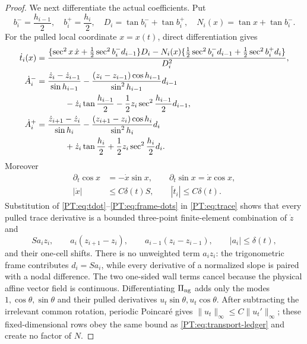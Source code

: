 \begin{proof}
We next differentiate the actual coefficients.  Put
\[
 b_i^- =\frac{h_{i-1}}2,\quad b_i^+=\frac{h_i}2,\quad
 D_i=\tan b_i^-+\tan b_i^+,\quad
 N_i(x)=\tan x+\tan b_i^-.
\]
For the pulled local coordinate $x=x(t)$, direct differentiation gives
\begin{align}
 \dot t_i(x)
 &=\frac{\{\sec^2x\,\dot x+\tfrac12\sec^2b_i^-d_{i-1}\}D_i
       -N_i(x)\{\tfrac12\sec^2b_i^-d_{i-1}
                  +\tfrac12\sec^2b_i^+d_i\}}
       {D_i^2},\label{PT:eq:tdot}\\
 \dot A_i^-
 &=\frac{\dot z_i-\dot z_{i-1}}{\sin h_{i-1}}
   -\frac{(z_i-z_{i-1})\cos h_{i-1}}{\sin^2h_{i-1}}d_{i-1}\\
 &\hspace{12mm}-\dot z_i\tan\frac{h_{i-1}}2
   -\frac12z_i\sec^2\frac{h_{i-1}}2d_{i-1},
 \label{PT:eq:Adot-minus}\\
 \dot A_i^+
 &=\frac{\dot z_{i+1}-\dot z_i}{\sin h_i}
   -\frac{(z_{i+1}-z_i)\cos h_i}{\sin^2h_i}d_i\\
 &\hspace{12mm}+\dot z_i\tan\frac{h_i}2
   +\frac12z_i\sec^2\frac{h_i}2d_i.
 \label{PT:eq:Adot-plus}
\end{align}
Moreover
\begin{align}
 \partial_t\cos x&=-\dot x\sin x,\qquad
 \partial_t\sin x=\dot x\cos x,\label{PT:eq:frame-dots}\\
 |\dot x|&\le C\delta(t)S,\qquad
 |\dot t_i|\le C\delta(t).
\end{align}
Substitution of \eqref{PT:eq:tdot}--\eqref{PT:eq:frame-dots} in
\eqref{PT:eq:trace} shows that every pulled trace derivative is a bounded
three-point finite-element combination of $\dot z$ and
\begin{equation}\label{PT:eq:transport-ledger}
 S a_i z_i,\qquad
 a_i(z_{i+1}-z_i),\qquad
 a_{i-1}(z_i-z_{i-1}),
 \qquad |a_i|\le\delta(t),
\end{equation}
and their one-cell shifts.  There is no unweighted term $a_i z_i$: the
trigonometric frame contributes $d_i=S a_i$, while every derivative of a
normalized slope is paired with a nodal difference.  The two one-sided
wall terms cancel because the physical affine vector field is continuous.
Differentiating $\Pi_{\rm ng}$ adds only the modes $1,\cos\theta,\sin\theta$ and
their pulled derivatives $u_t\sin\theta,u_t\cos\theta$.  After subtracting
the irrelevant common rotation, periodic Poincar\'e gives
$\|u_t\|_\infty\le C\|u_t'\|_\infty$; these fixed-dimensional rows obey
the same bound as \eqref{PT:eq:transport-ledger} and create no factor of $N$.


\end{proof}
